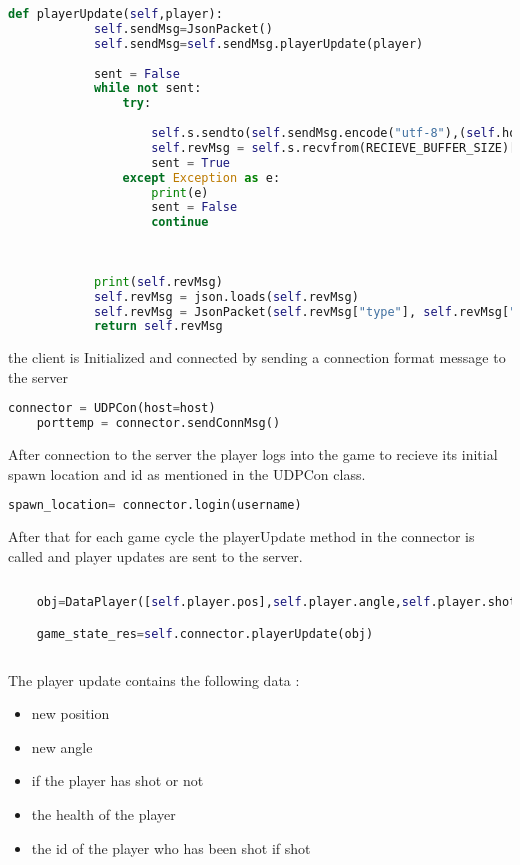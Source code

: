 \begin{lstlisting}[language=Python]
        def playerUpdate(self,player):
            self.sendMsg=JsonPacket()
            self.sendMsg=self.sendMsg.playerUpdate(player)
    
            sent = False
            while not sent:
                try:
    
                    self.s.sendto(self.sendMsg.encode("utf-8"),(self.host,self.port))
                    self.revMsg = self.s.recvfrom(RECIEVE_BUFFER_SIZE)[0]
                    sent = True
                except Exception as e:
                    print(e)
                    sent = False
                    continue
            
    
    
            print(self.revMsg)
            self.revMsg = json.loads(self.revMsg)
            self.revMsg = JsonPacket(self.revMsg["type"], self.revMsg["msg"])
            return self.revMsg
\end{lstlisting}

the client is Initialized and connected by sending a connection format message to the server

\begin{lstlisting}[language=Python]
    connector = UDPCon(host=host)
    porttemp = connector.sendConnMsg()
\end{lstlisting}

After connection to the server the player logs into the game to recieve its initial spawn location and id as mentioned in the UDPCon class.

\begin{lstlisting}[language=Python]
    spawn_location= connector.login(username)
\end{lstlisting}


After that for each game cycle the playerUpdate  method in the connector is called and player updates are sent to the server.

\begin{lstlisting}[language=Python]
   
    obj=DataPlayer([self.player.pos],self.player.angle,self.player.shot,self.player.health,self.player.shotWho)

    game_state_res=self.connector.playerUpdate(obj)
    
\end{lstlisting}
    
The player update contains the following data : 
\begin{itemize}
    \item new position
    \item new angle
    \item if the player has shot or not
    \item the health of the player
    \item the id of the player who has been shot if shot
\end{itemize}


